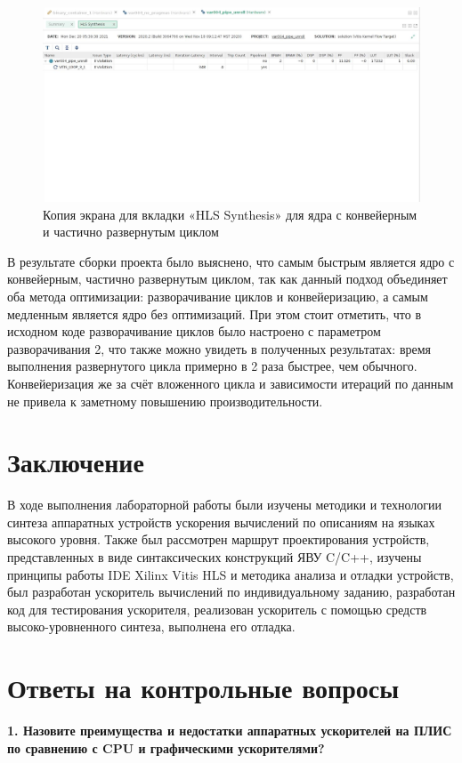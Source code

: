 \documentclass[12pt]{report}
\begin{document}
\newpage
\begin{figure}[h!p]
	\centering
	\includegraphics[width = \linewidth]{syn_pipe_unroll.png}
	\caption{Копия экрана для вкладки «HLS Synthesis» для ядра с конвейерным и частично развернутым циклом}
	\label{img:syn_pipe_unroll}
\end{figure}

В результате сборки проекта было выяснено, что самым быстрым является ядро с конвейерным, частично развернутым циклом, так как данный подход объединяет оба метода оптимизации: разворачивание циклов и конвейеризацию, а самым медленным является ядро без оптимизаций. При этом стоит отметить, что в исходном коде разворачивание циклов было настроено с параметром разворачивания 2, что также можно увидеть в полученных результатах: время выполнения развернутого цикла примерно в 2 раза быстрее, чем обычного. Конвейеризация же за счёт вложенного цикла и зависимости итераций по данным не привела к заметному повышению производительности.

\chapter*{Заключение}
В ходе выполнения лабораторной работы были изучены методики и технологии синтеза аппаратных устройств ускорения вычислений по описаниям на языках высокого уровня. Также был рассмотрен маршрут проектирования устройств, представленных в виде синтаксических конструкций ЯВУ C/C++, изучены принципы работы IDE Xilinx Vitis HLS и методика анализа и отладки устройств, был разработан ускоритель вычислений по индивидуальному заданию, разработан код для тестирования ускорителя, реализован ускоритель с помощью средств высоко-уровненного синтеза, выполнена его отладка.

\chapter*{Ответы на контрольные вопросы}
\textbf{1. Назовите преимущества и недостатки аппаратных ускорителей на ПЛИС по сравнению с CPU и графическими ускорителями?}
    
\end{document}
